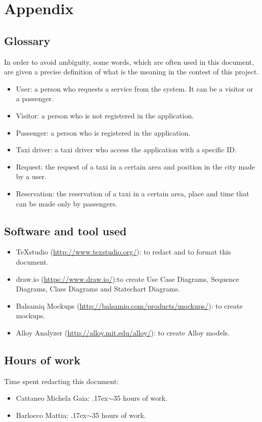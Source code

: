 \documentclass[18pt,oneside,a4paper, titlepage]{article}
\begin{document}
\section{Appendix}
	\subsection{Glossary}
		In order to avoid ambiguity, some words, which are often used in this document, are given a precise definition of what is the meaning in the contest of this project.
		\begin{itemize}
			\item User: a person who requests a service from the system. It can be a visitor or a passenger.
			\item Visitor: a person who is not registered in the application.
			\item Passenger: a person who is registered in the application.
			\item Taxi driver: a taxi driver who access the application with a specific ID.
			\item Request: the request of a taxi in a certain area and position in the city made by a user.
			\item Reservation: the reservation of a taxi in a certain area, place and time that can be made only by passengers.
	\end{itemize}
	\subsection{Software and tool used}
		\begin{itemize}
			\item TeXstudio (\url{http://www.texstudio.org/}): to redact and to format this document.
			\item draw.io (\url{https://www.draw.io/}):to create Use Case Diagrams, Sequence Diagrams, Class Diagrams and Statechart Diagrams.
			\item Balsamiq Mockups (\url{http://balsamiq.com/products/mockups/}): to create mockups.
			\item Alloy Analyzer (\url{http://alloy.mit.edu/alloy/}): to create Alloy models.
		\end{itemize}
	
	\subsection{Hours of work}
		Time spent redacting this document:
		\begin{itemize}
			\item Cattaneo Michela Gaia: {\raise.17ex\hbox{$\scriptstyle\sim$}}35 hours of work.
			\item Barlocco Mattia: {\raise.17ex\hbox{$\scriptstyle\sim$}}35 hours of work.
		\end{itemize}
\end{document}
